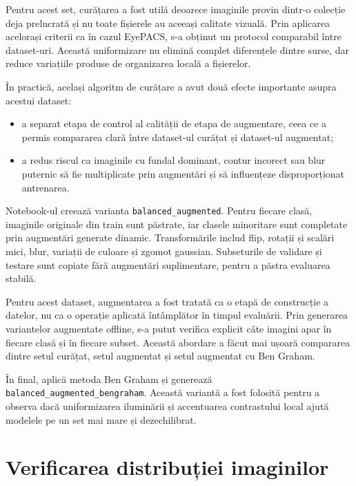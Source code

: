 \documentclass[12pt, a4paper, twoside, romanian]{teza-upb}
\begin{document}
Pentru acest set, curățarea a fost utilă deoarece imaginile provin dintr-o colecție deja
prelucrată și nu toate fișierele au aceeași calitate vizuală. Prin aplicarea acelorași criterii
ca în cazul EyePACS, s-a obținut un protocol comparabil între dataset-uri. Această uniformizare
nu elimină complet diferențele dintre surse, dar reduce variațiile produse de organizarea locală
a fișierelor.
\bigskip

În practică, același algoritm de curățare a avut două efecte importante asupra acestui dataset:

\begin{itemize}
  \item a separat etapa de control al calității de etapa de augmentare, ceea ce a permis compararea clară între dataset-ul curățat și dataset-ul augmentat;
  \item a redus riscul ca imaginile cu fundal dominant, contur incorect sau blur puternic să fie multiplicate prin augmentări și să influențeze disproporționat antrenarea.
\end{itemize}
\bigskip

Notebook-ul  creează varianta \texttt{balanced\_augmented}.
Pentru fiecare clasă, imaginile originale din train sunt păstrate, iar clasele minoritare sunt
completate prin augmentări generate dinamic. Transformările includ flip, rotații și scalări
mici, blur, variații de culoare și zgomot gaussian. Subseturile de validare și testare sunt
copiate fără augmentări suplimentare, pentru a păstra evaluarea stabilă.
\bigskip

Pentru acest dataset, augmentarea a fost tratată ca o etapă de construcție a datelor, nu ca o
operație aplicată întâmplător în timpul evaluării. Prin generarea variantelor augmentate offline,
s-a putut verifica explicit câte imagini apar în fiecare clasă și în fiecare subset. Această
abordare a făcut mai ușoară compararea dintre setul curățat, setul augmentat și setul augmentat
cu Ben Graham.
\bigskip

În final,  aplică metoda Ben Graham și generează
\texttt{balanced\_augmented\_bengraham}. Această variantă a fost folosită pentru a observa dacă
uniformizarea iluminării și accentuarea contrastului local ajută modelele pe un set mai mare
și dezechilibrat.

\section{Verificarea distribuției imaginilor}
\end{document}

